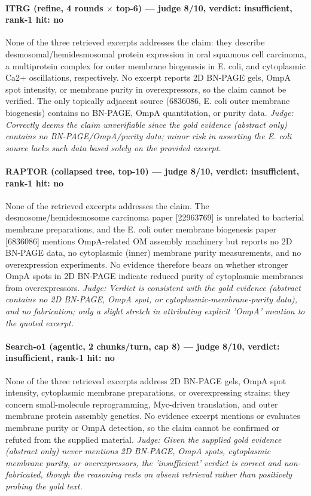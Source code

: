 \documentclass[sigconf, review, anonymous]{acmart}
\begin{document}
\paragraph{ITRG (refine, 4 rounds $\times$ top-6) --- judge 8/10, verdict: insufficient, rank-1 hit: no}
\noindent None of the three retrieved excerpts addresses the claim: they describe desmosomal/hemidesmosomal protein expression in oral squamous cell carcinoma, a multiprotein complex for outer membrane biogenesis in E. coli, and cytoplasmic Ca2+ oscillations, respectively. No excerpt reports 2D BN-PAGE gels, OmpA spot intensity, or membrane purity in overexpressors, so the claim cannot be verified. The only topically adjacent source (6836086, E. coli outer membrane biogenesis) contains no BN-PAGE, OmpA quantitation, or purity data.
\noindent\small\textit{Judge: Correctly deems the claim unverifiable since the gold evidence (abstract only) contains no BN-PAGE/OmpA/purity data; minor risk in asserting the E. coli source lacks such data based solely on the provided excerpt.}
\paragraph{RAPTOR (collapsed tree, top-10) --- judge 8/10, verdict: insufficient, rank-1 hit: no}
\noindent None of the retrieved excerpts addresses the claim. The desmosome/hemidesmosome carcinoma paper [22963769] is unrelated to bacterial membrane preparations, and the E. coli outer membrane biogenesis paper [6836086] mentions OmpA-related OM assembly machinery but reports no 2D BN-PAGE data, no cytoplasmic (inner) membrane purity measurements, and no overexpression experiments. No evidence therefore bears on whether stronger OmpA spots in 2D BN-PAGE indicate reduced purity of cytoplasmic membranes from overexpressors.
\noindent\small\textit{Judge: Verdict is consistent with the gold evidence (abstract contains no 2D BN-PAGE, OmpA spot, or cytoplasmic-membrane-purity data), and no fabrication; only a slight stretch in attributing explicit 'OmpA' mention to the quoted excerpt.}
\paragraph{Search-o1 (agentic, 2 chunks/turn, cap 8) --- judge 8/10, verdict: insufficient, rank-1 hit: no}
\noindent None of the three retrieved excerpts address 2D BN-PAGE gels, OmpA spot intensity, cytoplasmic membrane preparations, or overexpressing strains; they concern small-molecule reprogramming, Myc-driven translation, and outer membrane protein assembly genetics. No evidence excerpt mentions or evaluates membrane purity or OmpA detection, so the claim cannot be confirmed or refuted from the supplied material.
\noindent\small\textit{Judge: Given the supplied gold evidence (abstract only) never mentions 2D BN-PAGE, OmpA spots, cytoplasmic membrane purity, or overexpressors, the 'insufficient' verdict is correct and non-fabricated, though the reasoning rests on absent retrieval rather than positively probing the gold text.}
\end{document}
